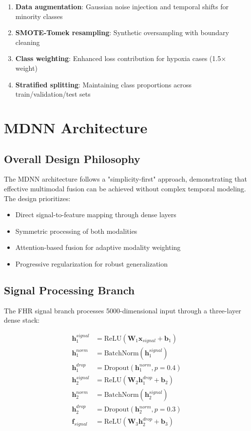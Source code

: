 \documentclass[12pt,a4paper]{article}
\begin{document}
\begin{enumerate}
    \item \textbf{Data augmentation}: Gaussian noise injection and temporal shifts for minority classes
    \item \textbf{SMOTE-Tomek resampling}: Synthetic oversampling with boundary cleaning
    \item \textbf{Class weighting}: Enhanced loss contribution for hypoxia cases (1.5× weight)
    \item \textbf{Stratified splitting}: Maintaining class proportions across train/validation/test sets
\end{enumerate}

\section{MDNN Architecture}

\subsection{Overall Design Philosophy}
The MDNN architecture follows a "simplicity-first" approach, demonstrating that effective multimodal fusion can be achieved without complex temporal modeling. The design prioritizes:

\begin{itemize}
    \item Direct signal-to-feature mapping through dense layers
    \item Symmetric processing of both modalities
    \item Attention-based fusion for adaptive modality weighting
    \item Progressive regularization for robust generalization
\end{itemize}

\subsection{Signal Processing Branch}
The FHR signal branch processes 5000-dimensional input through a three-layer dense stack:

\begin{align}
\mathbf{h}_1^{signal} &= \text{ReLU}(\mathbf{W}_1 \mathbf{x}_{signal} + \mathbf{b}_1) \\
\mathbf{h}_1^{norm} &= \text{BatchNorm}(\mathbf{h}_1^{signal}) \\
\mathbf{h}_1^{drop} &= \text{Dropout}(\mathbf{h}_1^{norm}, p=0.4) \\
\mathbf{h}_2^{signal} &= \text{ReLU}(\mathbf{W}_2 \mathbf{h}_1^{drop} + \mathbf{b}_2) \\
\mathbf{h}_2^{norm} &= \text{BatchNorm}(\mathbf{h}_2^{signal}) \\
\mathbf{h}_2^{drop} &= \text{Dropout}(\mathbf{h}_2^{norm}, p=0.3) \\
\mathbf{f}_{signal} &= \text{ReLU}(\mathbf{W}_3 \mathbf{h}_2^{drop} + \mathbf{b}_3)
\end{align}
\end{document}

